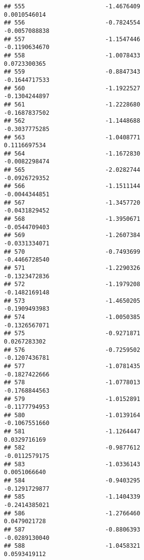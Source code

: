 \documentclass[
]{article}
\begin{document}
\begin{verbatim}
## 555                       -1.4676409                          0.0010546014
## 556                       -0.7824554                         -0.0057088838
## 557                       -1.1547446                         -0.1190634670
## 558                       -1.0078433                          0.0723300365
## 559                       -0.8847343                         -0.1644717533
## 560                       -1.1922527                         -0.1304244897
## 561                       -1.2228680                         -0.1687837502
## 562                       -1.1448688                         -0.3037775285
## 563                       -1.0408771                          0.1116697534
## 564                       -1.1672830                         -0.0082298474
## 565                       -2.0282744                         -0.0926729352
## 566                       -1.1511144                         -0.0044344851
## 567                       -1.3457720                         -0.0431829452
## 568                       -1.3950671                         -0.0544709403
## 569                       -1.2607384                         -0.0331334071
## 570                       -0.7493699                         -0.4466728540
## 571                       -1.2290326                         -0.1323472836
## 572                       -1.1979208                         -0.1482169148
## 573                       -1.4650205                         -0.1909493983
## 574                       -1.0050385                         -0.1326567071
## 575                       -0.9271871                          0.0267283302
## 576                       -0.7259502                         -0.1207436781
## 577                       -1.0781435                         -0.1827422666
## 578                       -1.0778013                         -0.1768844563
## 579                       -1.0152891                         -0.1177794953
## 580                       -1.0139164                         -0.1067551660
## 581                       -1.1264447                          0.0329716169
## 582                       -0.9877612                         -0.0112579175
## 583                       -1.0336143                          0.0051066640
## 584                       -0.9403295                         -0.1291729877
## 585                       -1.1404339                         -0.2414385021
## 586                       -1.2766460                          0.0479021728
## 587                       -0.8806393                         -0.0289130040
## 588                       -1.0458321                          0.0593419112

\end{verbatim}
\end{document}
